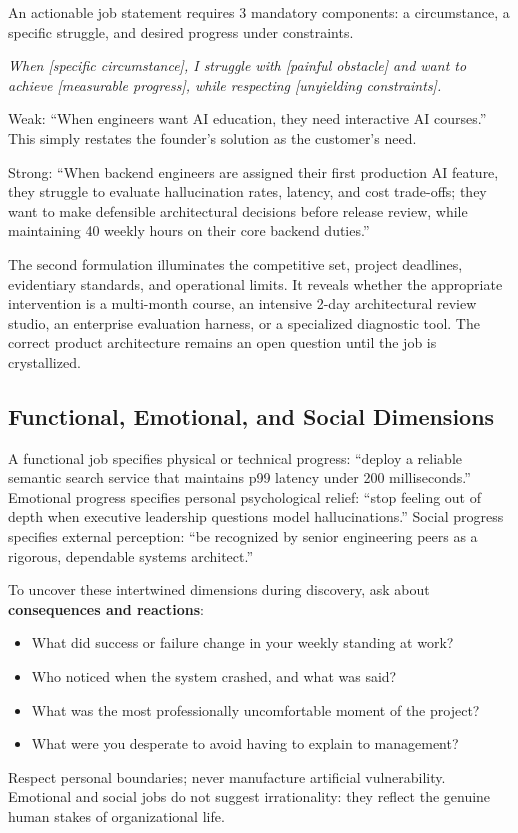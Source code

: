 An actionable job statement requires 3 mandatory components: a circumstance, a specific struggle, and desired progress under constraints.
\begin{center}
\small\itshape
When [specific circumstance], I struggle with [painful obstacle] and want to achieve [measurable progress], while respecting [unyielding constraints].
\end{center}

Weak: ``When engineers want AI education, they need interactive AI courses.'' This simply restates the founder's solution as the customer's need.

Strong: ``When backend engineers are assigned their first production AI feature, they struggle to evaluate hallucination rates, latency, and cost trade-offs; they want to make defensible architectural decisions before release review, while maintaining 40 weekly hours on their core backend duties.''

The second formulation illuminates the competitive set, project deadlines, evidentiary standards, and operational limits. It reveals whether the appropriate intervention is a multi-month course, an intensive 2-day architectural review studio, an enterprise evaluation harness, or a specialized diagnostic tool. The correct product architecture remains an open question until the job is crystallized.

\subsection{Functional, Emotional, and Social Dimensions}

A functional job specifies physical or technical progress: ``deploy a reliable semantic search service that maintains p99 latency under 200 milliseconds.'' Emotional progress specifies personal psychological relief: ``stop feeling out of depth when executive leadership questions model hallucinations.'' Social progress specifies external perception: ``be recognized by senior engineering peers as a rigorous, dependable systems architect.''

To uncover these intertwined dimensions during discovery, ask about \textbf{consequences and reactions}:
\begin{itemize}[leftmargin=1.2em,itemsep=0.2ex]
  \item What did success or failure change in your weekly standing at work?
  \item Who noticed when the system crashed, and what was said?
  \item What was the most professionally uncomfortable moment of the project?
  \item What were you desperate to avoid having to explain to management?
\end{itemize}
Respect personal boundaries; never manufacture artificial vulnerability. Emotional and social jobs do not suggest irrationality: they reflect the genuine human stakes of organizational life.

